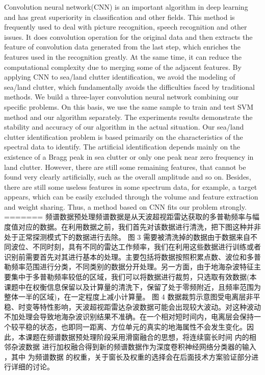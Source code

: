Convolution neural network(CNN) is an important algorithm in deep learning and has great superiority in classification and other fields. This method is frequently used to deal with picture recognition, speech recognition and other issues. It does convolution operation for the original data and then extracts the feature of convolution data generated from the last step, which enriches the features used in the recognition greatly. At the same time, it can reduce the computational complexity due to merging some of the adjacent features. By applying CNN to sea/land clutter identification, we avoid the modeling of sea/land clutter, which fundamentally avoids the difficulties faced by traditional methods. We build a three-layer convolution neural network combining our specific problems. On this basis, we use the same sample to train and test SVM method and our algorithm separately. The experiments results demonstrate the stability and accuracy of our algorithm in the actual situation. Our sea/land clutter identification problem is based primarily on the characteristics of the spectral data to identify. The artificial identification depends mainly on the existence of a Bragg peak in sea clutter or only one peak near zero frequency in land clutter. However, there are still some remaining features, that cannot be found very clearly artificially, such as the overall amplitude and so on. Besides, there are still some useless features in some spectrum data, for example, a target appears, which can be easily excluded through the volume and feature extraction and weight sharing. Thus, a method based on CNN fits our problem strongly.
=======
频谱数据预处理频谱数据是从天波超视距雷达获取的多普勒频率与幅度值对应的数据。在利用数据之前，我们首先对该数据进行清洗，把下图这种并非处于正常探测模式下的数据进行去除。 图 3 需要被清洗掉的数据由于数据来自不同波位、不同时刻，具有不同的雷达工作频率，我们在利用这些数据进行训练或者识别前需要首先对其进行基本的处理。主要包括将数据按照积累点数、波位和多普勒频率范围进行分类，不同类别的数据分开处理。另一方面，由于地海杂波特征主要集中于多普勒频率较低的区域，我们可以将数据进行裁剪，只选取有效数据(本课题中在权衡信息保留以及计算量的清洗下，保留了处于零频附近，且频率范围为整体一半的区域)，在一定程度上减小计算量。 图 4 数据裁剪示意图受电离层非平稳、时变等特性影响，天波超视距雷达杂波数据可能会出现较大波动。对这种波动不加处理会导致地海杂波识别结果不准确。在一个相对短时间内，电离层会保持一个较平稳的状态，也即同一距离、方位单元的真实的地海属性不会发生变化。因此，本课题在频谱数据预处理阶段采用滑窗融合的思想，将连续窗长时间 内的相邻杂波数据 进行加权融合得到新的频谱数据作为深度卷积神经网络分类器的输入 ，其中 为频谱数据 的权重，关于窗长及权重的选择会在后面技术方案验证部分进行详细的讨论。

